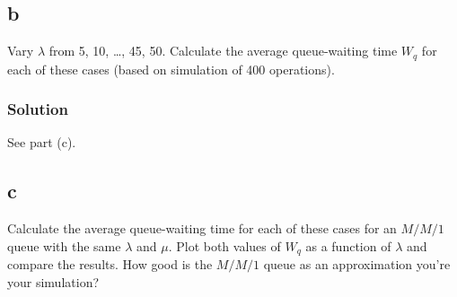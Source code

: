 \documentclass[letterpaper]{amsart}
\begin{document}
\subsection*{b}
Vary $\lambda$ from 5, 10, \ldots, 45, 50. Calculate the average queue-waiting time
$W_q$ for each of these cases (based on simulation of 400 operations).
\subsubsection*{Solution}
See part (c).

\subsection*{c}
Calculate the average queue-waiting time for each of these cases for an
$M/M/1$ queue with the same $\lambda$ and $\mu$. Plot both values of $W_q$ as a function
of $\lambda$ and compare the results. How good is the $M/M/1$ queue as an
approximation you’re your simulation?
\end{document}
